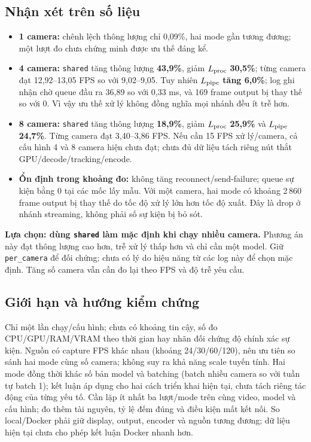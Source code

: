 \documentclass[10pt,a4paper]{article}
\newcommand{\shared}{\texttt{shared}}
\newcommand{\percam}{\texttt{per\_camera}}
\begin{document}
\subsection*{Nhận xét trên số liệu}
\begin{itemize}
\item \textbf{1 camera:} chênh lệch thông lượng chỉ 0,09\%, hai mode gần tương
đương; một lượt đo chưa chứng minh được ưu thế đáng kể.
\item \textbf{4 camera:} \shared{} tăng thông lượng \textbf{43,9\%}, giảm
$L_{\rm proc}$ \textbf{30,5\%}; từng camera đạt 12,92--13,05 FPS so với
9,02--9,05. Tuy nhiên $L_{\rm pipe}$ \textbf{tăng 6,0\%}; log ghi nhận chờ queue
đầu ra 36,89 so với 0,33 ms, và 169 frame output bị thay thế so với 0.
Vì vậy ưu thế xử lý không đồng nghĩa mọi nhánh đều ít trễ hơn.
\item \textbf{8 camera:} \shared{} tăng thông lượng \textbf{18,9\%}, giảm
$L_{\rm proc}$ \textbf{25,9\%} và $L_{\rm pipe}$ \textbf{24,7\%}.
Từng camera đạt 3,40--3,86 FPS. Nếu cần 15 FPS xử lý/camera, cả cấu hình 4 và 8
camera hiện chưa đạt; chưa đủ dữ liệu tách riêng nút thắt GPU/decode/tracking/encode.
\item \textbf{Ổn định trong khoảng đo:} không tăng reconnect/send-failure;
queue sự kiện bằng 0 tại các mốc lấy mẫu. Với một camera, hai mode có khoảng
2\,860 frame output bị thay thế do tốc độ xử lý lớn hơn tốc độ xuất.
Đây là drop ở nhánh streaming, không phải số sự kiện bị bỏ sót.
\end{itemize}

\textbf{Lựa chọn: dùng \shared{} làm mặc định khi chạy nhiều camera.}
Phương án này đạt thông lượng cao hơn, trễ xử lý thấp hơn và chỉ cần một model.
Giữ \percam{} để đối chứng; chưa có lý do hiệu năng từ các log này để chọn mặc
định. Tăng số camera vẫn cần đo lại theo FPS và độ trễ yêu cầu.

\subsection*{Giới hạn và hướng kiểm chứng}
Chỉ một lần chạy/cấu hình; chưa có khoảng tin cậy, số đo CPU/GPU/RAM/VRAM
theo thời gian hay nhãn đối chứng độ chính xác sự kiện. Nguồn có capture FPS
khác nhau (khoảng 24/30/60/120), nên ưu tiên so sánh hai mode cùng số camera;
không suy ra khả năng scale tuyến tính. Hai mode đồng thời khác số bản model
và batching (batch nhiều camera so với tuần tự batch 1); kết luận áp dụng cho
hai cách triển khai hiện tại, chưa tách riêng tác động của từng yếu tố.
Cần lặp ít nhất ba lượt/mode trên cùng
video, model và cấu hình; đo thêm tài nguyên, tỷ lệ đếm đúng và điều kiện mất
kết nối. So local/Docker phải giữ display, output, encoder và nguồn tương
đương; dữ liệu hiện tại chưa cho phép kết luận Docker nhanh hơn.
\end{document}
